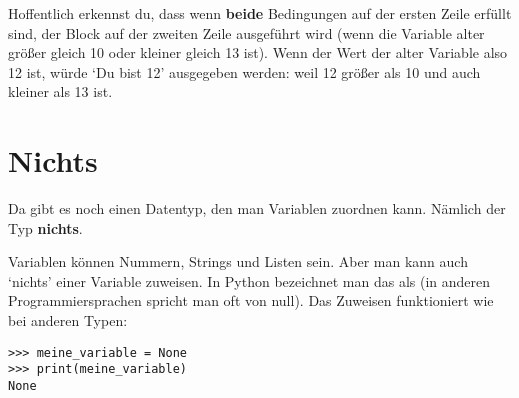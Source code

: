 Hoffentlich erkennst du, dass wenn \textbf{beide} Bedingungen auf der ersten Zeile erfüllt sind, der Block auf der zweiten Zeile ausgeführt wird (wenn die Variable alter größer gleich 10 oder kleiner gleich 13 ist). Wenn der Wert der alter Variable also 12 ist, würde `Du bist 12' ausgegeben werden: weil 12 größer als 10 und auch kleiner als 13 ist.

\section{Nichts}

Da gibt es noch einen Datentyp, den man Variablen zuordnen kann. Nämlich der Typ \textbf{nichts}.
\par
Variablen können Nummern, Strings und Listen sein. Aber man kann auch `nichts' einer Variable zuweisen. In Python bezeichnet man das als  (in anderen Programmiersprachen spricht man oft von null). Das Zuweisen funktioniert wie bei anderen Typen:

\begin{Verbatim}[frame=single]
>>> meine_variable = None
>>> print(meine_variable)
None
\end{Verbatim}

